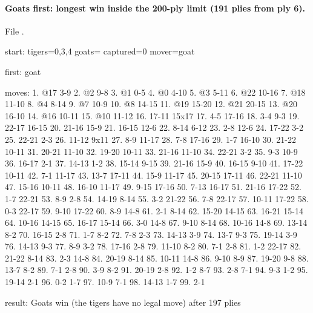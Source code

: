 \paragraph{Goats first: longest win inside the 200-ply limit (191 plies from ply 6).} File .
\begin{gamelisting}
start: tigers=0,3,4 goats= captured=0 mover=goat\par
first: goat\par
moves: 1. @17 3-9 2. @2 9-8 3. @1 0-5 4. @0 4-10 5. @3 5-11 6. @22 10-16 7. @18 11-10 8. @4 8-14 9. @7 10-9 10. @8 14-15 11. @19 15-20 12. @21 20-15 13. @20 16-10 14. @16 10-11 15. @10 11-12 16. 17-11 15x17 17. 4-5 17-16 18. 3-4 9-3 19. 22-17 16-15 20. 21-16 15-9 21. 16-15 12-6 22. 8-14 6-12 23. 2-8 12-6 24. 17-22 3-2 25. 22-21 2-3 26. 11-12 9x11 27. 8-9 11-17 28. 7-8 17-16 29. 1-7 16-10 30. 21-22 10-11 31. 20-21 11-10 32. 19-20 10-11 33. 21-16 11-10 34. 22-21 3-2 35. 9-3 10-9 36. 16-17 2-1 37. 14-13 1-2 38. 15-14 9-15 39. 21-16 15-9 40. 16-15 9-10 41. 17-22 10-11 42. 7-1 11-17 43. 13-7 17-11 44. 15-9 11-17 45. 20-15 17-11 46. 22-21 11-10 47. 15-16 10-11 48. 16-10 11-17 49. 9-15 17-16 50. 7-13 16-17 51. 21-16 17-22 52. 1-7 22-21 53. 8-9 2-8 54. 14-19 8-14 55. 3-2 21-22 56. 7-8 22-17 57. 10-11 17-22 58. 0-3 22-17 59. 9-10 17-22 60. 8-9 14-8 61. 2-1 8-14 62. 15-20 14-15 63. 16-21 15-14 64. 10-16 14-15 65. 16-17 15-14 66. 3-0 14-8 67. 9-10 8-14 68. 10-16 14-8 69. 13-14 8-2 70. 16-15 2-8 71. 1-7 8-2 72. 7-8 2-3 73. 14-13 3-9 74. 13-7 9-3 75. 19-14 3-9 76. 14-13 9-3 77. 8-9 3-2 78. 17-16 2-8 79. 11-10 8-2 80. 7-1 2-8 81. 1-2 22-17 82. 21-22 8-14 83. 2-3 14-8 84. 20-19 8-14 85. 10-11 14-8 86. 9-10 8-9 87. 19-20 9-8 88. 13-7 8-2 89. 7-1 2-8 90. 3-9 8-2 91. 20-19 2-8 92. 1-2 8-7 93. 2-8 7-1 94. 9-3 1-2 95. 19-14 2-1 96. 0-2 1-7 97. 10-9 7-1 98. 14-13 1-7 99. 2-1\par
result: Goats win (the tigers have no legal move) after 197 plies\par
\end{gamelisting}

